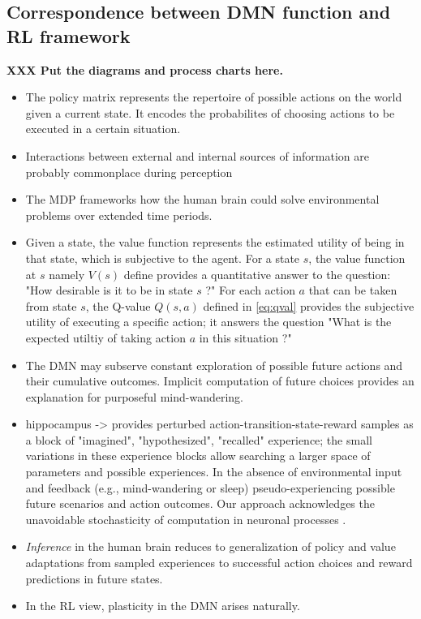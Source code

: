 \documentclass{article} %
\begin{document}
\subsection{Correspondence between DMN function and RL framework}
\textbf{XXX Put the diagrams and process charts here.}
\begin{itemize}
  \item The policy matrix represents the repertoire of possible actions
  on the world given a current state. It encodes the probabilites of
  choosing actions to be executed in a certain situation.
  \item Interactions between external and internal sources of
  information are probably commonplace during perception
  \item The MDP frameworks how the human brain could solve
  environmental problems over extended time periods.
  \item Given a state, the value function represents the estimated utility of
  being in that state, which is subjective to the agent. 
  For a state $s$, the value function at $s$ namely $V(s)$ define provides a quantitative answer to the question:
  "How desirable is it to be in state $s$ ?"
  For each action $a$ that can be taken from state $s$,
  the Q-value  $Q(s, a)$ defined in \eqref{eq:qval} provides the subjective
  utility of executing a specific action; it answers the question
  "What is the expected utiltiy of taking action $a$ in this situation ?"
  \item The DMN may subserve
  constant exploration of possible future actions and their
  cumulative outcomes. Implicit computation of future choices 
  provides an explanation for purposeful mind-wandering.
  \item hippocampus -> provides perturbed action-transition-state-reward samples
  as a block of "imagined", "hypothesized", "recalled" experience;
  the small variations in these experience blocks allow searching
  a larger space of parameters and possible experiences.
  In the absence of environmental input and feedback
  (e.g., mind-wandering or sleep) pseudo-experiencing possible
  future scenarios and action outcomes.
  Our approach acknowledges the unavoidable stochasticity of
  computation in neuronal processes \cite{faisal2008noise}.
  \item
  \textit{Inference} in the human brain reduces to generalization of
  policy and value adaptations from sampled experiences to
  successful action choices and reward predictions in future states.
  \item In the RL view, plasticity in the DMN arises naturally.

\end{itemize}
\end{document}
